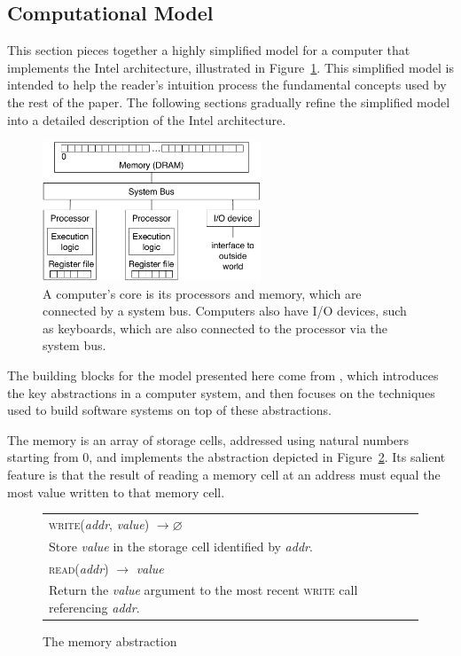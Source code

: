 \subsection{Computational Model}
\label{sec:resources}

This section pieces together a highly simplified model for a computer that
implements the Intel architecture, illustrated in
Figure~\ref{fig:computer_model}. This simplified model is intended to help the
reader's intuition process the fundamental concepts used by the rest of the
paper. The following sections gradually refine the simplified model into a
detailed description of the Intel architecture.

\begin{figure}[hbt]
  \centering
  \includegraphics[width=65mm]{figures/computer_model.pdf}
  \caption{
    A computer's core is its processors and memory, which are connected by a
    system bus. Computers also have I/O devices, such as keyboards, which are
    also connected to the processor via the system bus.
  }
  \label{fig:computer_model}
\end{figure}


The building blocks for the model presented here come from
\cite{saltzer2009systemdesign}, which introduces the key abstractions in a
computer system, and  then focuses on the techniques used to build software
systems on top of these abstractions.

The memory is an array of storage cells, addressed using natural numbers
starting from 0, and implements the abstraction depicted in
Figure~\ref{fig:memory_abstraction}. Its salient feature is that the result of
reading a memory cell at an address must equal the most value written to that
memory cell.

\begin{figure}[hbt]
  \centering
  \begin{tabularx}{\columnwidth}{| X |}
  \hline
  \textsc{write}(\textit{addr}, \textit{value}) $ \rightarrow \varnothing $ \\
  Store \textit{value} in the storage cell identified by \textit{addr}. \\
  \hline
  \textsc{read}(\textit{addr}) $ \rightarrow $ \textit{value} \\
  Return the \textit{value} argument to the most recent \textsc{write} call
  referencing \textit{addr}. \\
  \hline
  \end{tabularx}
  \caption{The memory abstraction}
  \label{fig:memory_abstraction}
\end{figure}

